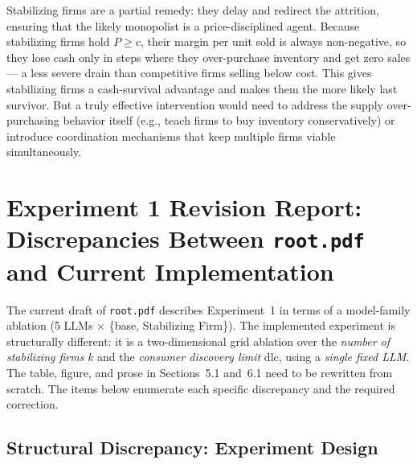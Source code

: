 \documentclass{article}
\begin{document}
Stabilizing firms are a partial remedy: they delay and redirect the attrition, ensuring that the likely monopolist is a price-disciplined agent. Because stabilizing firms hold \(P \geq c\), their margin per unit sold is always non-negative, so they lose cash only in steps where they over-purchase inventory and get zero sales --- a less severe drain than competitive firms selling below cost. This gives stabilizing firms a cash-survival advantage and makes them the more likely last survivor. But a truly effective intervention would need to address the supply over-purchasing behavior itself (e.g., teach firms to buy inventory conservatively) or introduce coordination mechanisms that keep multiple firms viable simultaneously.


\newpage
\section{Experiment 1 Revision Report: Discrepancies Between \texttt{root.pdf} and Current Implementation}
\label{sec:exp1-revision}

The current draft of \texttt{root.pdf} describes Experiment~1 in terms of a
model-family ablation (5 LLMs $\times$ \{base, Stabilizing Firm\}).
The implemented experiment is structurally different: it is a two-dimensional
grid ablation over the \emph{number of stabilizing firms} $k$ and the
\emph{consumer discovery limit} $\mathrm{dlc}$, using a \emph{single fixed LLM}.
The table, figure, and prose in Sections~5.1 and~6.1 need to be rewritten from scratch.
The items below enumerate each specific discrepancy and the required correction.

\subsection{Structural Discrepancy: Experiment Design}
\end{document}
